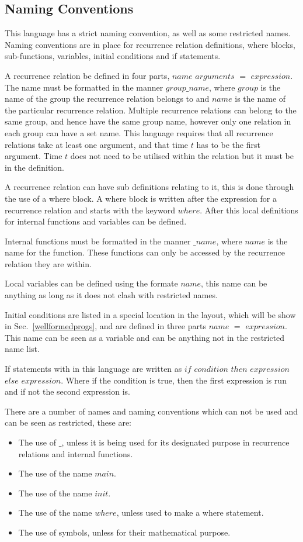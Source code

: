 \documentclass{article}
\begin{document}
\subsection{Naming Conventions}
This language has a strict naming convention, as well as some restricted names. Naming conventions are in place for recurrence relation definitions, where blocks, sub-functions, variables, initial conditions and  if statements. 

A recurrence relation be defined in four parts, $name$ $arguments$ $=$ $expression$. The name must be formatted in the manner $group\_name$, where $group$ is the name of the group the recurrence relation belongs to and $name$ is the name of the particular recurrence relation. Multiple recurrence relations can belong to the same group, and hence have the same group name, however only one relation in each group can have a set name. This language requires that all recurrence relations take at least one argument, and that time $t$ has to be the first argument. Time $t$ does not need to be utilised within the relation but it must be in the definition.     

A recurrence relation can have sub definitions relating to it, this is done through the use of a where block. A where block is written after the expression for a recurrence relation and starts with the keyword $where$. After this local definitions for internal functions and variables can be defined. 

Internal functions must be formatted in the manner $\_name$, where $name$ is the name for the function. These functions can only be accessed by the recurrence relation they are within. 

Local variables can be defined using the formate $name$, this name can be anything as long as it does not clash with restricted names. 

Initial conditions are listed in a special location in the layout, which will be show in Sec.~\ref{wellformedprogs}, and are defined in three parts $name$ $=$ $expression$. This name can be seen as a variable and can be anything not in the restricted name list. 

If statements with in this language are written as $if$ $condition$ $then$ $expression$ $else$ $expression$. Where if the condition is true, then the first expression is run and if not the second expression is.  

There are a number of names and naming conventions which can not be used and can be seen as restricted, these are:
\begin{itemize}
  \item The use of $\_$, unless it is being used for its designated purpose in recurrence relations and internal functions. 
  \item The use of the name $main$.
  \item The use of the name $init$.
  \item The use of the name $where$, unless used to make a where statement.
  \item The use of symbols, unless for their mathematical purpose.  
\end{itemize}
\end{document}
